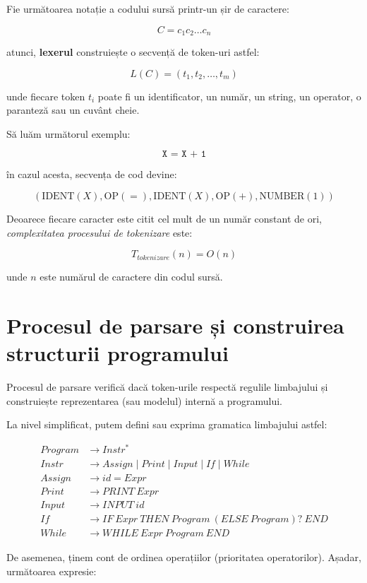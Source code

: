 \documentclass[12pt]{article}
\begin{document}
Fie următoarea notație a codului sursă printr-un șir de caractere:

\[
C = c_1c_2 \ldots c_n
\]

atunci, \textbf{lexerul} construiește o secvență de token-uri astfel:

\[
L(C) = (t_1, t_2, \ldots, t_m)
\]

unde fiecare token \(t_i\) poate fi un identificator, un număr, un string, un operator, o paranteză sau un cuvânt cheie.

Să luăm următorul exemplu:

\[
\texttt{X = X + 1}
\]

în cazul acesta, secvența de cod devine:

\[
(\text{IDENT}(X), \text{OP}(=), \text{IDENT}(X), \text{OP}(+), \text{NUMBER}(1))
\]

Deoarece fiecare caracter este citit cel mult de un număr constant de ori, \textit{complexitatea procesului de tokenizare} este:

\[
T_{tokenizare}(n) = O(n)
\]

unde \(n\) este numărul de caractere din codul sursă.

\section{Procesul de parsare și construirea structurii programului}

Procesul de parsare verifică dacă token-urile respectă regulile limbajului și construiește reprezentarea (sau modelul) internă a programului.

La nivel simplificat, putem defini sau exprima gramatica limbajului astfel:

\[
\begin{aligned}
Program &\rightarrow Instr^* \\
Instr &\rightarrow Assign \mid Print \mid Input \mid If \mid While \\
Assign &\rightarrow id = Expr \\
Print &\rightarrow PRINT \ Expr \\
Input &\rightarrow INPUT \ id \\
If &\rightarrow IF \ Expr \ THEN \ Program \ (ELSE \ Program)? \ END \\
While &\rightarrow WHILE \ Expr \ Program \ END
\end{aligned}
\]

De asemenea, ținem cont de ordinea operațiilor (prioritatea operatorilor). Așadar, următoarea expresie:
\end{document}
